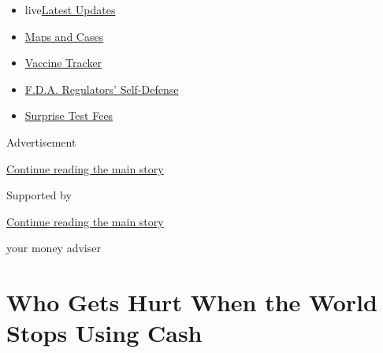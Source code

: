 \begin{itemize}
\tightlist
\item
  live\href{https://www.nytimes3xbfgragh.onion/2020/09/12/world/covid-19-coronavirus.html?name=styln-coronavirus-national\&region=TOP_BANNER\&block=storyline_menu_recirc\&action=click\&pgtype=Article\&impression_id=8c17d641-f52c-11ea-bf06-e35e969503ac\&variant=undefined}{Latest
  Updates}
\item
  \href{https://www.nytimes3xbfgragh.onion/interactive/2020/us/coronavirus-us-cases.html?name=styln-coronavirus-national\&region=TOP_BANNER\&block=storyline_menu_recirc\&action=click\&pgtype=Article\&impression_id=8c17d642-f52c-11ea-bf06-e35e969503ac\&variant=undefined}{Maps
  and Cases}
\item
  \href{https://www.nytimes3xbfgragh.onion/interactive/2020/science/coronavirus-vaccine-tracker.html?name=styln-coronavirus-national\&region=TOP_BANNER\&block=storyline_menu_recirc\&action=click\&pgtype=Article\&impression_id=8c17fd50-f52c-11ea-bf06-e35e969503ac\&variant=undefined}{Vaccine
  Tracker}
\item
  \href{https://www.nytimes3xbfgragh.onion/2020/09/10/us/politics/fda-coronavirus-vaccine.html?name=styln-coronavirus-national\&region=TOP_BANNER\&block=storyline_menu_recirc\&action=click\&pgtype=Article\&impression_id=8c17fd51-f52c-11ea-bf06-e35e969503ac\&variant=undefined}{F.D.A.
  Regulators' Self-Defense}
\item
  \href{https://www.nytimes3xbfgragh.onion/2020/09/09/upshot/coronavirus-surprise-test-fees.html?name=styln-coronavirus-national\&region=TOP_BANNER\&block=storyline_menu_recirc\&action=click\&pgtype=Article\&impression_id=8c17fd52-f52c-11ea-bf06-e35e969503ac\&variant=undefined}{Surprise
  Test Fees}
\end{itemize}

Advertisement

\protect\hyperlink{after-top}{Continue reading the main story}

Supported by

\protect\hyperlink{after-sponsor}{Continue reading the main story}

your money adviser

\hypertarget{who-gets-hurt-when-the-world-stops-using-cash}{%
\section{Who Gets Hurt When the World Stops Using
Cash}\label{who-gets-hurt-when-the-world-stops-using-cash}}

